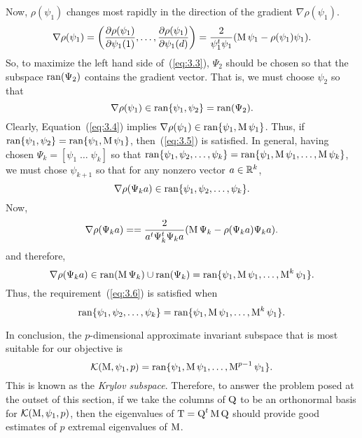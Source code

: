 Now, $\rho(\psi_1)$ changes most rapidly in the direction of the gradient
$\nabla \rho(\psi_1)$.
\begin{equation}
  \label{eq:3.4}
\nabla \rho(\psi_1) = \left(\frac{\partial \rho(\psi_1)}{\partial \psi_1(1)}, \dots,
\frac{\partial \rho(\psi_1)}{\partial \psi_1(d)}\right)
 = \frac{2}{\psi_1^t\psi_1} (\operatorname{M}\psi_1 - \rho(\psi_1)\psi_1).
\end{equation}
So, to maximize the left hand side of~(\ref{eq:3.3}), $\Psi_2$ should be chosen
so that the subspace $\operatorname{ran}(\Psi_2)$ contains the gradient vector.
That is, we must choose $\psi_2$ so that
\begin{equation}
\label{eq:3.5}
\nabla \rho(\psi_1) \in \operatorname{ran}\{\psi_1, \psi_2\} = \operatorname{ran}(\Psi_2).
\end{equation}
Clearly, Equation~(\ref{eq:3.4}) implies 
$\nabla \rho(\psi_1) \in \operatorname{ran}\{\psi_1, \operatorname{M}\psi_1\}$.
Thus, if $\operatorname{ran}\{\psi_1, \psi_2\} = \operatorname{ran}\{\psi_1, \operatorname{M}\psi_1\}$, 
then~(\ref{eq:3.5}) is satisfied.
%
%
%
%
In general, having chosen $\Psi_k = [\psi_1 \; \dots \; \psi_k]$ so that
$\operatorname{ran}\{\psi_1, \psi_2, \dots, \psi_k\} = \operatorname{ran}\{\psi_1, \operatorname{M}\psi_1, \dots,
\operatorname{M}\psi_k\}$,
we must chose $\psi_{k+1}$ so that for any nonzero vector $a\in \mathbb{R}^k$,
\begin{equation}
\label{eq:3.6}
\nabla \rho(\Psi_ka) \in \operatorname{ran}\{\psi_1, \psi_2, \dots, \psi_k\}.
\end{equation}
Now,
\[
\nabla \rho(\Psi_ka)  = 
 = \frac{2}{a^t\Psi_k^t\Psi_ka} (\operatorname{M}\Psi_k - \rho(\Psi_ka)\Psi_ka).
\]
and therefore,
\[
\nabla \rho(\Psi_ka)  \in 
\operatorname{ran}(\operatorname{M}\Psi_k) \cup \operatorname{ran}(\Psi_k) = \operatorname{ran}\{\psi_1, \operatorname{M}\psi_1, \dots, \operatorname{M}^k\psi_1\}.
\]
Thus, the requirement~(\ref{eq:3.6}) is satisfied when 
\[
\operatorname{ran}\{\psi_1, \psi_2, \dots, \psi_k\} = \operatorname{ran}\{\psi_1, \operatorname{M}\psi_1, \dots,
\operatorname{M}^k\psi_1\}.
\]

In conclusion, the $p$-dimensional approximate invariant subspace that is most suitable
for our objective is
\[
\mathcal{K}(\operatorname{M}, \psi_1, p) = \operatorname{ran}\{\psi_1, \operatorname{M}\psi_1, \dots, \operatorname{M}^{p-1}\psi_1\}.
\]
This is known as the \emph{Krylov subspace}. Therefore, to answer the problem posed at the outset
of this section, if we take the columns of $\operatorname{Q}$ to be an orthonormal basis for 
$\mathcal{K}(\operatorname{M},\psi_1, p)$, then the eigenvalues of $\operatorname{T} = \operatorname{Q}^t\operatorname{M}\operatorname{Q}$ should provide good
estimates of $p$ extremal eigenvalues of $\operatorname{M}$. 
%
%
%
%
